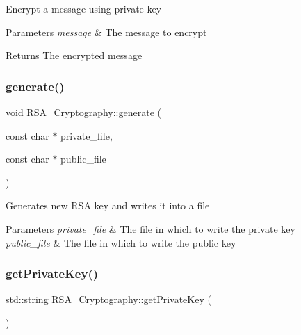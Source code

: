 Encrypt a message using private key


\begin{DoxyParams}{Parameters}
{\em message} & The message to encrypt \\
\hline
\end{DoxyParams}
\begin{DoxyReturn}{Returns}
The encrypted message 
\end{DoxyReturn}
\mbox{\label{classRSA__Cryptography_aaf500fcdcc050fa8d18a0dbe43176d17}} 
\subsubsection{\texorpdfstring{generate()}{generate()}}
{\footnotesize\ttfamily void R\+S\+A\+\_\+\+Cryptography\+::generate (\begin{DoxyParamCaption}\item[{const char $\ast$}]{private\+\_\+file,  }\item[{const char $\ast$}]{public\+\_\+file }\end{DoxyParamCaption})}

Generates new R\+SA key and writes it into a file


\begin{DoxyParams}{Parameters}
{\em private\+\_\+file} & The file in which to write the private key \\
\hline
{\em public\+\_\+file} & The file in which to write the public key \\
\hline
\end{DoxyParams}
\mbox{\label{classRSA__Cryptography_aecdd6715cb222a98b5810f49103c34d7}} 
\subsubsection{\texorpdfstring{get\+Private\+Key()}{getPrivateKey()}}
{\footnotesize\ttfamily std\+::string R\+S\+A\+\_\+\+Cryptography\+::get\+Private\+Key (\begin{DoxyParamCaption}{ }\end{DoxyParamCaption})}

